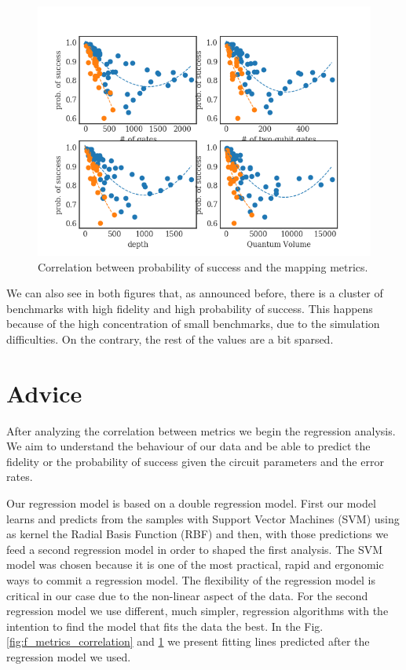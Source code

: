 \begin{figure}[htbp]
\centering
\includegraphics[width=\textwidth]{figures/ps_metrics_correlation.png}
\caption{\label{fig:ps_metrics_correlation}
Correlation between probability of success and the mapping metrics.}
\end{figure}

We can also see in both figures that, as announced before, there is a cluster of benchmarks with high fidelity and high probability of success.
This happens because of the high concentration of small benchmarks, due to the simulation difficulties.
On the contrary, the rest of the values are a bit sparsed.

\section{Advice}
\label{sec:org19da4a6}
After analyzing the correlation between metrics we begin the regression analysis.
We aim to understand the behaviour of our data and be able to predict the fidelity or the probability of success given the circuit parameters and the error rates.

Our regression model is based on a double regression model.
First our model learns and predicts from the samples with Support Vector Machines (SVM) using as kernel the Radial Basis Function (RBF) and then, with those predictions we feed a second regression model in order to shaped the first analysis.
The SVM model was chosen because it is one of the most practical, rapid and ergonomic ways to commit a regression model.
The flexibility of the regression model is critical in our case due to the non-linear aspect of the data.
For the second regression model we use different, much simpler, regression algorithms with the intention to find the model that fits the data the best.
In the Fig. \ref{fig:f_metrics_correlation} and \ref{fig:ps_metrics_correlation} we present fitting lines predicted after the regression model we used.

